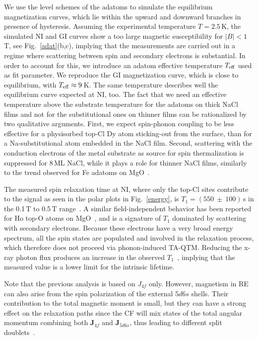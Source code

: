 {We use the level schemes of the adatoms to simulate the equilibrium magnetization curves, which lie within the upward and downward branches in presence of hysteresis. Assuming the experimental  temperature $T=2.5$\,K, the simulated NI and GI curves show a too large magnetic susceptibility for $|B| < 1$\,T, see Fig.~\ref{adat}(b,c), implying that the measurements are carried out in a regime where scattering between spin and secondary electrons is substantial. In order to account for this, we introduce an adatom effective temperature $T_{\rm eff}$ used as fit parameter. We reproduce the GI magnetization curve, which is close to equilibrium, with $T_{\rm eff}\approx 9$\,K. The same temperature describes well the equilibrium curve expected at NI, too.
The fact that we need an effective temperature above the substrate temperature for the adatoms on thick NaCl films and not for the substitutional ones on thinner films can be rationalized by two qualitative arguments. First, we expect spin-phonon coupling to be less effective for a physisorbed top-Cl Dy atom sticking-out from the surface, than for a Na-substitutional atom embedded in the NaCl film. Second, scattering with the conduction electrons of the metal substrate as source for spin thermalization is suppressed for 8\,ML NaCl, while it plays a role for thinner NaCl films, similarly to the trend observed for Fe adatoms on MgO~\cite{pau17}.

The  measured spin relaxation time at NI, where only the top-Cl sites contribute to the signal as seen in the polar plots in Fig.~\ref{energy}, is  $T_1 = (550\ \pm\ 100)$\,s in the 0.1\,T to 0.5\,T range~\cite{SM}. A similar field-independent behavior has been reported for Ho top-O atoms on MgO~\cite{don20}, and is a signature of $T_1$ dominated by scattering with secondary electrons. Because these electrons have a very broad energy spectrum, all the spin states are populated and involved in the relaxation process, which therefore does not proceed via phonon-induced TA-QTM. Reducing the x-ray photon flux produces an increase in the observed $T_1$~\cite{don16}, implying that the measured value is a lower limit for the intrinsic lifetime.

Note that the previous analysis is based on $J_{4f}$ only. However, magnetism in RE can also arise from the spin polarization of the external $5d6s$ shells. Their contribution to the total magnetic moment is small, but they can have a strong effect on the relaxation paths since the CF will mix states of the total angular momentum combining both $\boldsymbol{J}_{4f}$ and $\boldsymbol{J}_{5d6s}$, thus leading to different split doublets~\cite{cur23}.

}
